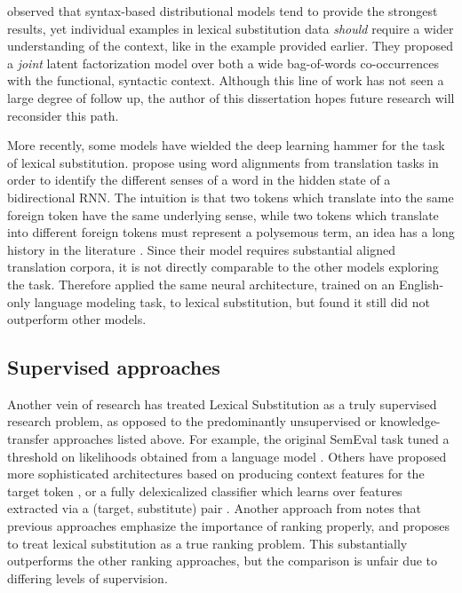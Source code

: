  observed that syntax-based distributional
models tend to provide the strongest results, yet individual examples in
lexical substitution data {\em should} require a wider understanding of the
context, like in the  example provided earlier. They proposed a
{\em joint} latent factorization model over both a wide bag-of-words
co-occurrences with the functional, syntactic context. Although this line of
work has not seen a large degree of follow up, the author of this dissertation
hopes future research will reconsider this path.

More recently, some models have wielded the deep learning hammer for the task
of lexical substitution.  propose using word
alignments from translation tasks in order to identify the different senses of
a word in the hidden state of a bidirectional RNN. The intuition is that two
tokens which translate into the same foreign token have the same underlying
sense, while two tokens which translate into different foreign tokens must
represent a polysemous term, an idea has a long history in the literature
\cite{resnik:1999:nle,diab:2003:phd,bannard:2005:acl}. Since their model
requires substantial aligned translation corpora, it is not directly comparable
to the other models exploring the task. Therefore 
applied the same neural architecture, trained on an English-only language
modeling task, to lexical substitution, but found it still did not outperform
other models.

\subsection{Supervised approaches}

Another vein of research has treated Lexical Substitution as a truly
supervised research problem, as opposed to the predominantly unsupervised or
knowledge-transfer approaches listed above. For example, the original SemEval
task tuned a threshold on likelihoods obtained from a language
model \cite{yuret:2007:semeval}. Others have proposed more sophisticated
architectures based on producing context features for the target token
\cite{biemann:2012:lrec}, or a fully delexicalized classifier which learns over
features extracted via a (target, substitute) pair \cite{szarvas:2013:naacl}.
Another approach from  notes that previous
approaches emphasize the importance of ranking properly, and proposes to treat
lexical substitution as a true ranking problem. This substantially outperforms
the other ranking approaches, but the comparison is unfair due to differing
levels of supervision.

